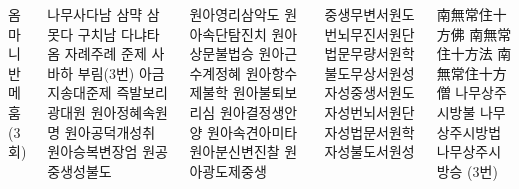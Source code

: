 \documentclass[20pt, a0paper ]{tikzposter}
\begin{document}
\begin{columns}
			{
				\begin{LARGE}
옴 마니반메 훔(3회)
				\end{LARGE}

			}



			{
				\begin{LARGE}
나무사다남 삼먁 삼못다 구치남 다냐타
옴 자례주례 준제 사바하 부림(3번)
아금지송대준제 즉발보리광대원 원아정혜속원명
원아공덕개성취 원아승복변장엄 원공중생성불도

				\end{LARGE}

			}



			{
				\begin{LARGE}
원아영리삼악도 원아속단탐진치 원아상문불법승
원아근수계정혜 원아항수제불학 원아불퇴보리심
원아결정생안양 원아속견아미타 원아분신변진찰
원아광도제중생

				\end{LARGE}

			}



			{
				\begin{LARGE}
중생무변서원도 번뇌무진서원단 법문무량서원학 불도무상서원성
자성중생서원도 자성번뇌서원단 자성법문서원학 자성불도서원성

				\end{LARGE}

			}



			{
				\begin{LARGE}



南無常住十方佛 南無常住十方法 南無常住十方僧
나무상주시방불 나무상주시방법 나무상주시방승 (3번)

				\end{LARGE}
			}



	\end{columns}
\end{document}

